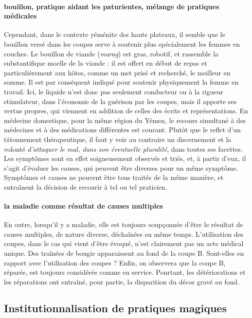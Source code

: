   \paragraph{bouillon, pratique aidant les paturientes, mélange de pratiques médicales}
Cependant, dans le contexte yéménite des hauts plateaux, il semble que le bouillon versé dans les coupes serve à soutenir plus spécialement les femmes en couches. Le bouillon de viande (\textit{marag}) est gras, robotif, et rassemble la substantifique moelle de la viande : il est offert en début de repas et particulièrement aux hôtes, comme un met prisé et recherché, le meilleur en somme. Il est par conséquent indiqué pour soutenir physiquement la femme en travail. Ici, le liquide n'est donc pas seulement conducteur ou à la rigueur stimulateur, dans l'économie de la guérison par les coupes, mais il apporte ses vertus propres, qui viennent en addition de celles des écrits et représentations. En médecine domestique, pour la même région du Yémen, le recours simultané à des médecines et à des médications différentes est courant. Plutôt que le reflet d'un tâtonnement thérapeutique, il faut y voir au contraire un discernement et la volonté \textit{d'attaquer le mal, dans son éventuelle pluralité}, dans toutes ses facettes. Les symptômes sont en effet soigneusement observés et triés, et, à partir d'eux, il s'agit d'évaluer les causes, qui peuvent être diverses pour un même symptôme. Symptômes et causes ne peuvent être tous traités de la même manière, et entraînent la décision de recourir à tel ou tel praticien. 
\paragraph{la maladie comme résultat de causes multiples}
En outre, lorsqu'il y a maladie, elle est toujours soupçonnée d'être le résultat de causes multiples, de nature diverse, déchaînées en même temps. L'utilisation des coupes, dans le cas qui vient d'être évoqué, n'est clairement pas un acte médical unique.
Des traînées de bougie apparaissent au fond de la coupe B. Sont-elles en rapport avec l'utilisation des coupes ? Enfin, on observera que la coupe B, réparée, est toujours considérée comme en service. Pourtant, les détériorations et les réparations ont entraîné, pour partie, la disparition du décor gravé au fond. 
\subsection{Institutionnalisation de pratiques magiques} 
 
